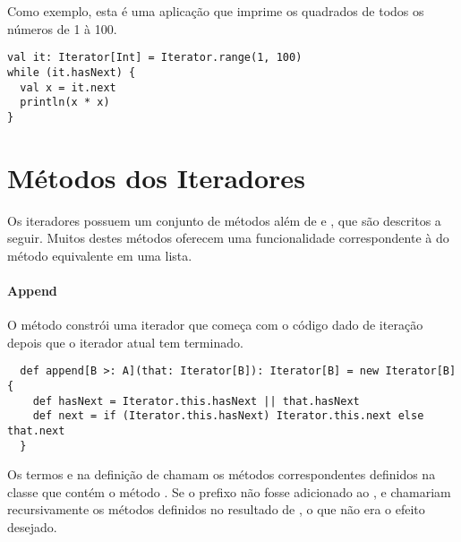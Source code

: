 {Como exemplo, esta é uma aplicação que imprime os quadrados de todos os números de 1 à 100.
\begin{lstlisting}
val it: Iterator[Int] = Iterator.range(1, 100)
while (it.hasNext) {
  val x = it.next
  println(x * x)
}
\end{lstlisting}

\section{Métodos dos Iteradores}

Os iteradores possuem um conjunto de métodos além de  e
, que são descritos a seguir. Muitos destes métodos
oferecem uma funcionalidade correspondente à do método equivalente em uma lista.

\paragraph{Append}
O método  constrói uma iterador que começa com o código dado de iteração ~~ depois 
que o iterador atual tem terminado.
\begin{lstlisting}
  def append[B >: A](that: Iterator[B]): Iterator[B] = new Iterator[B] {
    def hasNext = Iterator.this.hasNext || that.hasNext
    def next = if (Iterator.this.hasNext) Iterator.this.next else that.next
  }    
\end{lstlisting}
Os termos  e 
na definição de  chamam os métodos correspondentes definidos na classe  
que contém o método . Se o prefixo
 não fosse adicionado ao ,
 e  chamariam recursivamente os métodos definidos no resultado de ,
o que não era o efeito desejado.

}

